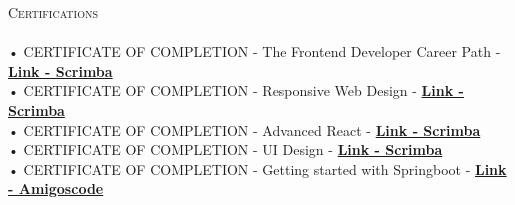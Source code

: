 \documentclass[a4paper]{article}
\newcommand{\lineunder} {
    \vspace*{-8pt} \\
    \hspace*{-18pt} \hrulefill \\
}
\newcommand{\header} [1] {
    {\hspace*{-18pt}\vspace*{6pt} \textsc{#1}}
    \vspace*{-6pt} \lineunder
}
\begin{document}
      \header{Certifications}
      \vspace{2mm}
      • CERTIFICATE OF COMPLETION - The Frontend Developer Career Path - \textbf{\href{https://v1.scrimba.com/certificate/u6b2wvcZ/gfrontend}{Link - Scrimba}}\\
\vspace*{1mm}
      • CERTIFICATE OF COMPLETION - Responsive Web Design - \textbf{\href{https://v1.scrimba.com/certificate/u6b2wvcZ/gresponsive}{Link - Scrimba}}\\
\vspace*{1mm}
      • CERTIFICATE OF COMPLETION - Advanced React - \textbf{\href{https://v1.scrimba.com/certificate/u6b2wvcZ/greact}{Link - Scrimba}}\\
\vspace*{1mm}
      • CERTIFICATE OF COMPLETION - UI Design - \textbf{\href{https://v1.scrimba.com/certificate/u6b2wvcZ/gdesignbootcamp}{Link - Scrimba}}\\
\vspace*{1mm}
      • CERTIFICATE OF COMPLETION - Getting started with Springboot - \textbf{\href{https://drive.google.com/file/d/132WvUhwo\_owlkpVQrIBNwRRe3v4OZNKg/view}{Link - Amigoscode}}\\
\vspace*{1mm}
      \vspace{2mm}



    \ 
    
\end{document}
